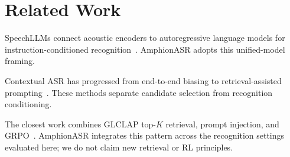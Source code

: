 \section{Related Work}
\label{sec:related}

SpeechLLMs connect acoustic encoders to autoregressive language models for instruction-conditioned recognition~\cite{chu2023qwenaudio,tang2024salmonn,bai2024seedasr,qwen2025qwen3asr}. AmphionASR adopts this unified-model framing.

Contextual ASR has progressed from end-to-end biasing to retrieval-assisted prompting~\cite{pundak2018deep,yang2024ctc,gong2025br,kong2025glclap}. These methods separate candidate selection from recognition conditioning.

The closest work combines GLCLAP top-$K$ retrieval, prompt injection, and GRPO~\cite{lakomkin2025contextual}. AmphionASR integrates this pattern across the recognition settings evaluated here; we do not claim new retrieval or RL principles.
